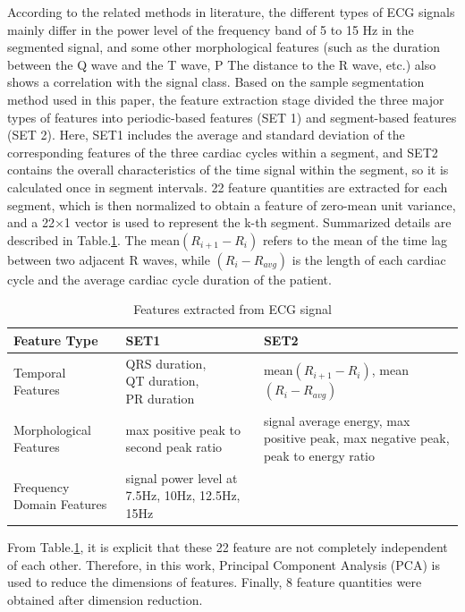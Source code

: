 According to the related methods in literature, the different types of ECG signals mainly differ in the power level of the frequency band of 5 to 15 Hz in the segmented signal, and some other morphological features (such as the duration between the Q wave and the T wave, P The distance to the R wave, etc.) also shows a correlation with the signal class. Based on the sample segmentation method used in this paper, the feature extraction stage divided the three major types of features into periodic-based features (SET 1) and segment-based features (SET 2). Here, SET1 includes the average and standard deviation of the corresponding features of the three cardiac cycles within a segment, and SET2 contains the overall characteristics of the time signal within the segment, so it is calculated once in segment intervals. 22 feature quantities are extracted for each segment, which is then normalized to obtain a feature of zero-mean unit variance, and a 22×1 vector is used to represent the k-th segment. Summarized details are described in Table.\ref{table:features}. The mean$(R_{i+1}-R_i)$ refers to the mean of the time lag between two adjacent R waves, while $(R_i-R_{avg})$ is the length of each cardiac cycle and the average cardiac cycle duration of the patient. 

\begin{table}[t]
	\caption{Features extracted from ECG signal}
	\label{table:features}
	\centering
	\begin{tabular}{|m{6em} | @{}m{7.4em} |@{} m{7.7em}|}
		\hline 
		Feature Type & SET1 & SET2 \\ 
		\hline 
		Temporal Features & QRS duration, ~~~~
		QT duration, ~~~~~~~
		PR duration & mean$(R_{i+1}-R_i)$, mean$(R_i-R_{avg})$  \\ 
		\hline 
		Morphological Features & max positive peak to second peak ratio & signal average energy, max positive peak, max
		negative
		peak, peak to
		energy ratio \\ 
		\hline 
		Frequency Domain Features & signal power level at 7.5Hz, 10Hz, 12.5Hz, 15Hz &  \\ 
		\hline 
	\end{tabular} 
\end{table}

From Table.\ref{table:features}, it is explicit that these 22 feature are not completely independent of each other. Therefore, in this work, Principal Component Analysis (PCA) is used to reduce the dimensions of features. Finally, 8 feature quantities were obtained after dimension reduction.


